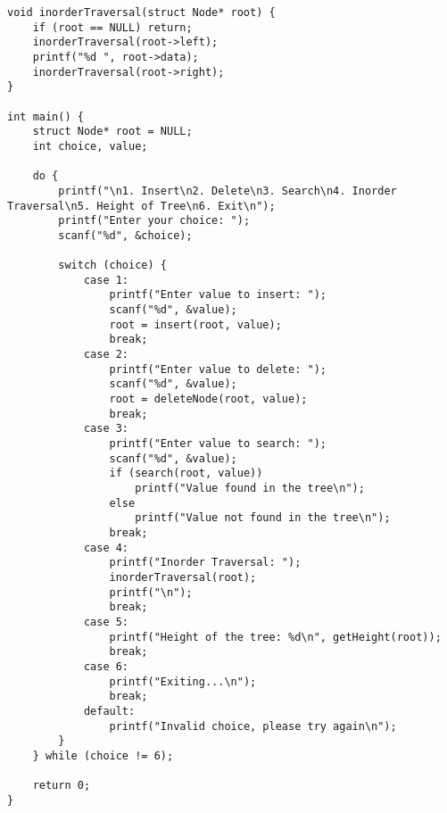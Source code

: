 \documentclass[12pt,a4paper]{article}
\begin{document}
\begin{lstlisting}
void inorderTraversal(struct Node* root) {
    if (root == NULL) return;
    inorderTraversal(root->left);
    printf("%d ", root->data);
    inorderTraversal(root->right);
}

int main() {
    struct Node* root = NULL;
    int choice, value;

    do {
        printf("\n1. Insert\n2. Delete\n3. Search\n4. Inorder Traversal\n5. Height of Tree\n6. Exit\n");
        printf("Enter your choice: ");
        scanf("%d", &choice);

        switch (choice) {
            case 1:
                printf("Enter value to insert: ");
                scanf("%d", &value);
                root = insert(root, value);
                break;
            case 2:
                printf("Enter value to delete: ");
                scanf("%d", &value);
                root = deleteNode(root, value);
                break;
            case 3:
                printf("Enter value to search: ");
                scanf("%d", &value);
                if (search(root, value))
                    printf("Value found in the tree\n");
                else
                    printf("Value not found in the tree\n");
                break;
            case 4:
                printf("Inorder Traversal: ");
                inorderTraversal(root);
                printf("\n");
                break;
            case 5:
                printf("Height of the tree: %d\n", getHeight(root));
                break;
            case 6:
                printf("Exiting...\n");
                break;
            default:
                printf("Invalid choice, please try again\n");
        }
    } while (choice != 6);

    return 0;
}
\end{lstlisting}
\newpage
\end{document}
